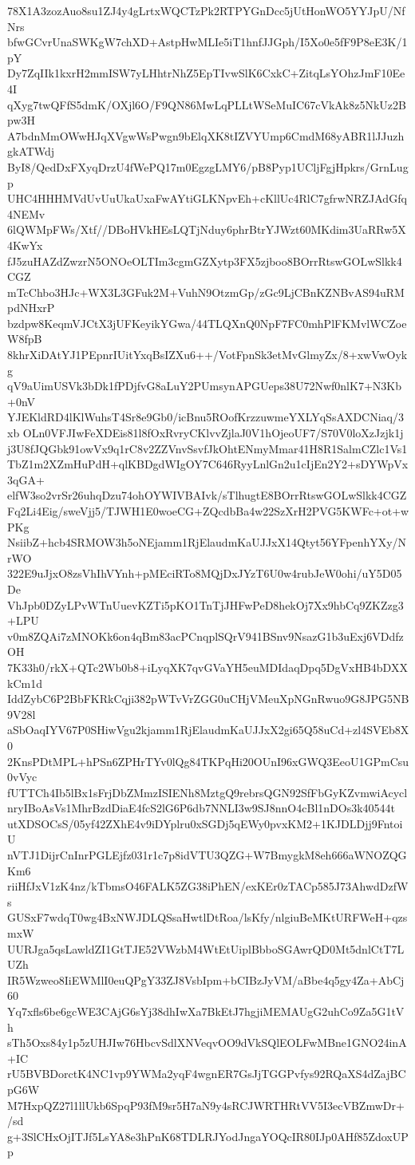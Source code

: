 78X1A3zozAuo8su1ZJ4y4gLrtxWQCTzPk2RTPYGnDcc5jUtHonWO5YYJpU/NfNrs
bfwGCvrUnaSWKgW7chXD+AstpHwMLIe5iT1hnfJJGph/I5Xo0e5fF9P8eE3K/1pY
Dy7ZqIIk1kxrH2mmISW7yLHhtrNhZ5EpTIvwSlK6CxkC+ZitqLsYOhzJmF10Ee4I
qXyg7twQFfS5dmK/OXjl6O/F9QN86MwLqPLLtWSeMuIC67cVkAk8z5NkUz2Bpw3H
A7bdnMmOWwHJqXVgwWsPwgn9bElqXK8tIZVYUmp6CmdM68yABR1lJJuzhgkATWdj
ByI8/QedDxFXyqDrzU4fWePQ17m0EgzgLMY6/pB8Pyp1UCljFgjHpkrs/GrnLugp
UHC4HHHMVdUvUuUkaUxaFwAYtiGLKNpvEh+cKllUc4RlC7gfrwNRZJAdGfq4NEMv
6lQWMpFWs/Xtf//DBoHVkHEsLQTjNduy6phrBtrYJWzt60MKdim3UaRRw5X4KwYx
fJ5zuHAZdZwzrN5ONOeOLTIm3cgmGZXytp3FX5zjboo8BOrrRtswGOLwSlkk4CGZ
mTcChbo3HJc+WX3L3GFuk2M+VuhN9OtzmGp/zGc9LjCBnKZNBvAS94uRMpdNHxrP
bzdpw8KeqmVJCtX3jUFKeyikYGwa/44TLQXnQ0NpF7FC0mhPlFKMvlWCZoeW8fpB
8khrXiDAtYJ1PEpnrIUitYxqBsIZXu6++/VotFpnSk3etMvGlmyZx/8+xwVwOykg
qV9aUimUSVk3bDk1fPDjfvG8aLuY2PUmsynAPGUeps38U72Nwf0nlK7+N3Kb+0nV
YJEKldRD4lKlWuhsT4Sr8e9Gb0/icBnu5ROofKrzzuwmeYXLYqSsAXDCNiaq/3xb
OLn0VFJIwFeXDEis81l8fOxRvryCKlvvZjlaJ0V1hOjeoUF7/S70V0loXzJzjk1j
j3U8fJQGbk91owVx9q1rC8v2ZZVnvSsvfJkOhtENmyMmar41H8R1SalmCZlc1Vs1
TbZ1m2XZmHuPdH+qlKBDgdWIgOY7C646RyyLnlGn2u1cIjEn2Y2+sDYWpVx3qGA+
elfW3so2vrSr26uhqDzu74ohOYWIVBAIvk/sTlhugtE8BOrrRtswGOLwSlkk4CGZ
Fq2Li4Eig/sweVjj5/TJWH1E0woeCG+ZQcdbBa4w22SzXrH2PVG5KWFc+ot+wPKg
NsiibZ+hcb4SRMOW3h5oNEjamm1RjElaudmKaUJJxX14Qtyt56YFpenhYXy/NrWO
322E9uJjxO8zsVhIhVYnh+pMEciRTo8MQjDxJYzT6U0w4rubJeW0ohi/uY5D05De
VhJpb0DZyLPvWTnUuevKZTi5pKO1TnTjJHFwPeD8hekOj7Xx9hbCq9ZKZzg3+LPU
v0m8ZQAi7zMNOKk6on4qBm83acPCnqplSQrV941BSnv9NsazG1b3uExj6VDdfzOH
7K33h0/rkX+QTc2Wb0b8+iLyqXK7qvGVaYH5euMDIdaqDpq5DgVxHB4bDXXkCm1d
IddZybC6P2BbFKRkCqji382pWTvVrZGG0uCHjVMeuXpNGnRwuo9G8JPG5NB9V28l
aSbOaqIYV67P0SHiwVgu2kjamm1RjElaudmKaUJJxX2gi65Q58uCd+zl4SVEb8X0
2KnsPDtMPL+hPSn6ZPHrTYv0lQg84TKPqHi20OUnI96xGWQ3EeoU1GPmCsu0vVyc
fUTTCh4Ib5lBx1sFrjDbZMmzISIENh8MztgQ9rebrsQGN92SfFbGyKZvmwiAcycl
nryIBoAsVs1MhrBzdDiaE4fcS2lG6P6db7NNLI3w9SJ8nnO4cBl1nDOs3k40544t
utXDSOCsS/05yf42ZXhE4v9iDYplru0xSGDj5qEWy0pvxKM2+1KJDLDjj9FntoiU
nVTJ1DijrCnInrPGLEjfz031r1c7p8idVTU3QZG+W7BmygkM8eh666aWNOZQGKm6
riiHfJxV1zK4nz/kTbmsO46FALK5ZG38iPhEN/exKEr0zTACp585J73AhwdDzfWs
GUSxF7wdqT0wg4BxNWJDLQSsaHwtlDtRoa/lsKfy/nlgiuBeMKtURFWeH+qzsmxW
UURJga5qsLawldZI1GtTJE52VWzbM4WtEtUiplBbboSGAwrQD0Mt5dnlCtT7LUZh
IR5Wzweo8IiEWMlI0euQPgY33ZJ8VsbIpm+bCIBzJyVM/aBbe4q5gy4Za+AbCj60
Yq7xfls6be6gcWE3CAjG6sYj38dhIwXa7BkEtJ7hgjiMEMAUgG2uhCo9Za5G1tVh
sTh5Oxs84y1p5zUHJIw76HbcvSdlXNVeqvOO9dVkSQlEOLFwMBne1GNO24inA+IC
rU5BVBDorctK4NC1vp9YWMa2yqF4wgnER7GsJjTGGPvfys92RQaXS4dZajBCpG6W
M7HxpQZ27l1llUkb6SpqP93fM9sr5H7aN9y4sRCJWRTHRtVV5I3ecVBZmwDr+/sd
g+3SlCHxOjITJf5LsYA8e3hPnK68TDLRJYodJngaYOQcIR80IJp0AHf85ZdoxUPp
